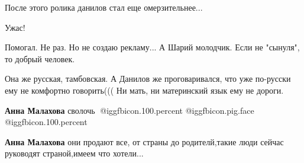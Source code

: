 \begin{itemize}
После этого ролика данилов стал еще омерзительнее...

Ужас!

Помогал. Не раз. Но не создаю рекламу... А Шарий молодчик. Если не "сынуля", то добрый человек.


Она же русская, тамбовская. А Данилов же проговаривался, что уже по-русски ему
не комфортно говорить((( Ни мать, ни материнский язык ему не дороги.

\begin{itemize} %
\textbf{Анна Малахова} сволочь🐀 @igg{fbicon.100.percent}  @igg{fbicon.pig.face}  @igg{fbicon.100.percent} 🦧🦧

\textbf{Анна Малахова} они продают все, от страны до родителй,такие люди сейчас руководят страной,имеем что хотели...
\end{itemize} %

\end{itemize} %
